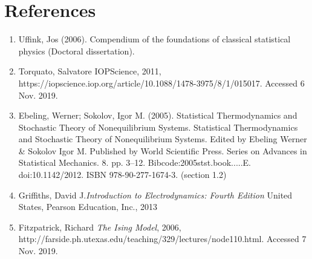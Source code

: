 \documentclass{article}
\begin{document}
\section{References}

\begin{enumerate}

\item Uffink, Jos (2006). Compendium of the foundations of classical statistical physics (Doctoral dissertation).

\item Torquato, Salvatore IOPScience, 2011, https://iopscience.iop.org/article/10.1088/1478-3975/8/1/015017. Accessed 6 Nov. 2019.

\item Ebeling, Werner; Sokolov, Igor M. (2005). Statistical Thermodynamics and Stochastic Theory of Nonequilibrium Systems. Statistical Thermodynamics and Stochastic Theory of Nonequilibrium Systems. Edited by Ebeling Werner \& Sokolov Igor M. Published by World Scientific Press. Series on Advances in Statistical Mechanics. 8. pp. 3–12. Bibcode:2005stst.book.....E. doi:10.1142/2012. ISBN 978-90-277-1674-3. (section 1.2)

\item Griffiths, David J.\textit{Introduction to Electrodynamics: Fourth Edition} United States, Pearson Education, Inc., 2013 

\item Fitzpatrick, Richard \textit{The Ising Model}, 2006, http://farside.ph.utexas.edu/teaching/329/lectures/node110.html. Accessed 7 Nov. 2019.

\end{enumerate}
\end{document}
